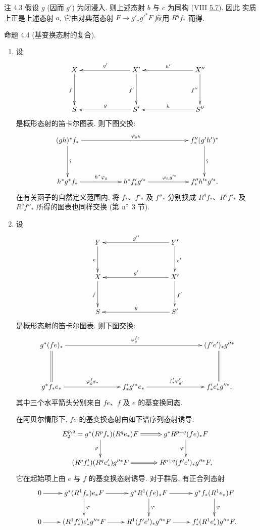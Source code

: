 \begin{enonce*}[remark]{注 4.3}
假设 $g$ (因而 $g'$) 为闭浸入. 则上述态射 $b$ 与 $c$ 为同构 (VIII \hyperref[VIII.cor5.7]{5.7}). 因此  实质上正是上述态射 $a$, 它由对典范态射 $F\rightarrow {g'}_{\ast}{g'}^{\ast}F$ 应用 $R^qf_{\ast}$ 而得.
\end{enonce*}

\begin{enonce*}{命题 4.4}
(基变换态射的复合).
\begin{enumerate}
\renewcommand{\theenumi}{\roman{enumi}}
\renewcommand{\labelenumi}{(\theenumi)}
\item 设
$$
\xymatrix@C=2.5cm@R=1.5cm{
X\ar[d]_{f}&X'\ar[l]_{g'}\ar[d]_{f'}&
X''\ar[l]_{h'}\ar[d]_{f''}\\
S&S'\ar[l]_{g}&S''\ar[l]_{h}
}
$$
是概形态射的\pageoriginale 笛卡尔图表. 则下图交换:
$$
\xymatrix@C=2cm@R=1.5cm{
(gh)^{\ast}f_{\ast}\ar[rr]^{\varphi_{gh}}
\ar[d]^{\text{\rotatebox{90}{$\backsim$}}}&&
f''_{\ast}(g'h')^{\ast}
\ar[d]^{\text{\rotatebox{90}{$\backsim$}}}\\
h^{\ast}g^{\ast}f_{\ast}
\ar[r]^{h^{\ast}\varphi_g}&
h^{\ast}f'_{\ast}g'^{\ast}
\ar[r]^{\varphi_h g'^{\ast}}&
f''_{\ast}h'^{\ast}g'^{\ast}.}
$$
在有关函子的自然定义范围内, 将 $f_{\ast}$、$f'_{\ast}$ 及 $f''_{\ast}$ 分别换成 $R^qf_{\ast}$、$R^qf'_{\ast}$ 及 $R^qf''_{\ast}$ 所得的图表也同样交换 \textup{(\cf 第 $\textup{n}^{\circ}$ 3 节)}.

\item 设
$$
\xymatrix@C=3.25cm@R=1.25cm{
Y\ar[d]_{e}&Y'\ar[l]_{g''}\ar[d]^{e'}\\
X\ar[d]_{f}&X'\ar[l]_{g'}\ar[d]^{f'}\\
S&S'\ar[l]_{g}
}
$$
是概形态射的笛卡尔图表. 则下图交换:
$$
\xymatrix@C=2.75cm@R=1.5cm{
g^{\ast}(fe)_{\ast}\ar[rr]^{\varphi_g^{fe}}\ar@{=}[d]&&
(f'e')_{\ast}g''^{\ast}\ar@{=}[d]\\
g^{\ast}f_{\ast}e_{\ast}
\ar[r]^{\varphi_g^f e_{\ast}}&
f'_{\ast}g'{}^{\ast}e_{\ast}
\ar[r]^{f'_{\ast}\varphi_{g'}^e}&
f'_{\ast}e'_{\ast}g''^{\ast},
}
$$
其中三个水平箭头分别来自 $fe$、$f$ 及 $e$ 的基变换同态.

在阿贝尔情形下, $fe$ 的基变换态射由如下谱序列态射诱导:
$$
\xymatrix{
E^{p,q}_2=g^{\ast}(R^pf_{\ast})(R^qe_{\ast})F
\ar@{=>}[r]\ar[d]_{\varphi}&
g^{\ast}R^{p+q}(fe)_{\ast}F\ar[d]_{\varphi}\\
(R^pf'_{\ast})(R^qe'_{\ast})g''^{\ast}F
\ar@{=>}[r]&R^{p+q}(f'e')_{\ast}g''^{\ast}F,
}
$$
它在起始项上由 $e$ 与 $f$ 的基变换态射诱导. 对于群层, 有正合列态射
$$
\xymatrix{
0\ar[r]&g^{\ast}(R^1f_{\ast})e_{\ast}F
\ar[r]\ar[d]^{\varphi}&
g^{\ast}R^1(fe)_{\ast}F\ar[r]\ar[d]^{\varphi}&
g^{\ast}f_{\ast}(R^1e_{\ast})F\ar[d]^{\varphi}\\
0\ar[r]&(R^1f'_{\ast})e'_{\ast}g''^{\ast}F\ar[r]&
R^1(f'e')_{\ast}g''^{\ast}F\ar[r]&
f'_{\ast}(R^1e'_{\ast})g''^{\ast}F.
}
$$
\end{enumerate}
\end{enonce*}

